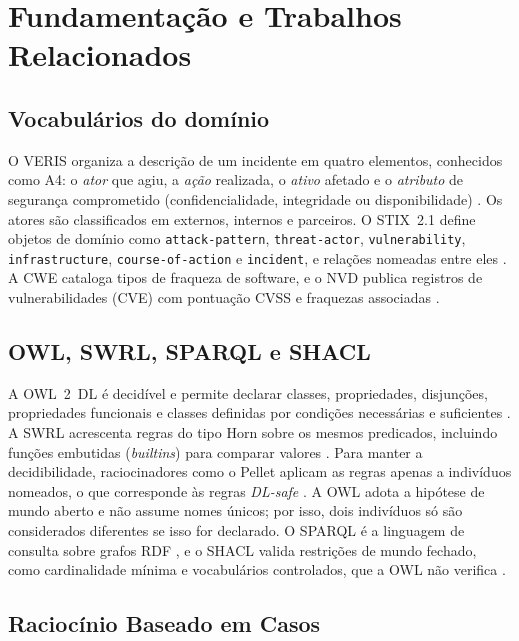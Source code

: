 \documentclass[12pt]{article}
\begin{document}
\section{Fundamentação e Trabalhos Relacionados}
\label{sec:fund}

\subsection{Vocabulários do domínio}

O VERIS organiza a descrição de um incidente em quatro elementos, conhecidos como A4: o \emph{ator} que agiu, a \emph{ação} realizada, o \emph{ativo} afetado e o \emph{atributo} de segurança comprometido (confidencialidade, integridade ou disponibilidade) \cite{veris}. Os atores são classificados em externos, internos e parceiros. O STIX~2.1 define objetos de domínio como \texttt{attack-pattern}, \texttt{threat-actor}, \texttt{vulnerability}, \texttt{infrastructure}, \texttt{course-of-action} e \texttt{incident}, e relações nomeadas entre eles \cite{stix21}. A CWE cataloga tipos de fraqueza de software, e o NVD publica registros de vulnerabilidades (CVE) com pontuação CVSS e fraquezas associadas \cite{cwe,nvd}.

\subsection{OWL, SWRL, SPARQL e SHACL}

A OWL~2~DL é decidível e permite declarar classes, propriedades, disjunções, propriedades funcionais e classes definidas por condições necessárias e suficientes \cite{owl2}. A SWRL acrescenta regras do tipo Horn sobre os mesmos predicados, incluindo funções embutidas (\emph{builtins}) para comparar valores \cite{swrl}. Para manter a decidibilidade, raciocinadores como o Pellet aplicam as regras apenas a indivíduos nomeados, o que corresponde às regras \emph{DL-safe} \cite{motik2005,pellet}. A OWL adota a hipótese de mundo aberto e não assume nomes únicos; por isso, dois indivíduos só são considerados diferentes se isso for declarado. O SPARQL é a linguagem de consulta sobre grafos RDF \cite{sparql11}, e o SHACL valida restrições de mundo fechado, como cardinalidade mínima e vocabulários controlados, que a OWL não verifica \cite{shacl}.

\subsection{Raciocínio Baseado em Casos}
\end{document}
